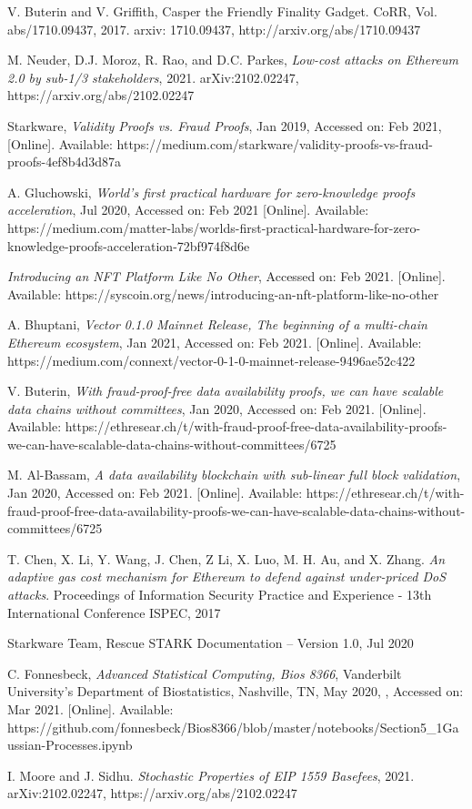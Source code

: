 \documentclass[peerreview]{ieeesyscoin}
\begin{document}
\begin{thebibliography}{00}
 V. Buterin and V. Griffith, Casper the Friendly Finality Gadget. CoRR, Vol. abs/1710.09437, 2017. arxiv: 1710.09437, http://arxiv.org/abs/1710.09437

 M. Neuder, D.J. Moroz, R. Rao, and D.C. Parkes, \textit{Low-cost attacks on Ethereum 2.0 by sub-1/3 stakeholders}, 2021. arXiv:2102.02247,  https://arxiv.org/abs/2102.02247

 Starkware, \textit{Validity Proofs vs. Fraud Proofs}, Jan 2019, Accessed on: Feb 2021, [Online]. Available: https://medium.com/starkware/validity-proofs-vs-fraud-proofs-4ef8b4d3d87a

 A. Gluchowski, \textit{World’s first practical hardware for zero-knowledge proofs acceleration}, Jul 2020, Accessed on: Feb 2021 [Online]. Available:  https://medium.com/matter-labs/worlds-first-practical-hardware-for-zero-knowledge-proofs-acceleration-72bf974f8d6e

  \textit{Introducing an NFT Platform Like No Other}, Accessed on: Feb 2021. [Online]. Available: https://syscoin.org/news/introducing-an-nft-platform-like-no-other

 A. Bhuptani, \textit{Vector 0.1.0 Mainnet Release, The beginning of a multi-chain Ethereum ecosystem}, Jan 2021, Accessed on: Feb 2021.  [Online]. Available:  https://medium.com/connext/vector-0-1-0-mainnet-release-9496ae52c422

  V. Buterin, \textit{With fraud-proof-free data availability proofs, we can have scalable data chains without committees}, Jan 2020, Accessed on: Feb 2021.  [Online]. Available:  https://ethresear.ch/t/with-fraud-proof-free-data-availability-proofs-we-can-have-scalable-data-chains-without-committees/6725

 M. Al-Bassam,\textit{ A data availability blockchain with sub-linear full block validation}, Jan 2020, Accessed on: Feb 2021.  [Online]. Available:  https://ethresear.ch/t/with-fraud-proof-free-data-availability-proofs-we-can-have-scalable-data-chains-without-committees/6725

  T. Chen, X. Li, Y. Wang, J. Chen, Z Li, X. Luo, M. H. Au, and X. Zhang. \textit{An adaptive gas cost mechanism for Ethereum to defend against under-priced DoS attacks}. Proceedings of Information Security Practice and Experience - 13th International Conference ISPEC, 2017

  Starkware Team, Rescue STARK Documentation – Version 1.0, Jul 2020

 C. Fonnesbeck, \textit{Advanced Statistical Computing, Bios 8366}, Vanderbilt University's Department of Biostatistics, Nashville, TN, May 2020, , Accessed on: Mar 2021.  [Online]. Available:  https://github.com/fonnesbeck/Bios8366/blob/master/notebooks/Section5\_1\-Gaussian-Processes.ipynb

  I. Moore and J. Sidhu. \textit{Stochastic Properties of EIP 1559 Basefees}, 2021. arXiv:2102.02247,  https://arxiv.org/abs/2102.02247



\end{thebibliography}


\EOD
\end{document}
